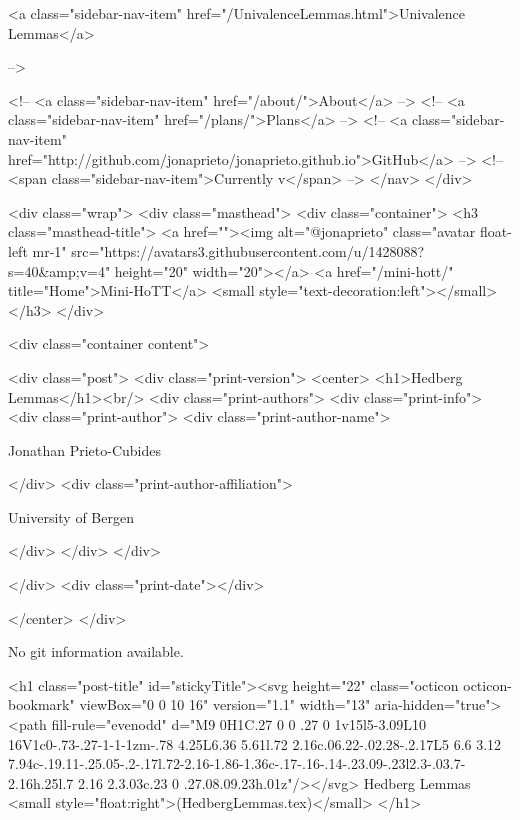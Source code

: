       
    
      
        
          <a class="sidebar-nav-item" href="/UnivalenceLemmas.html">Univalence Lemmas</a>
        
      
     -->

    <!-- <a class="sidebar-nav-item" href="/about/">About</a> -->
    <!-- <a class="sidebar-nav-item" href="/plans/">Plans</a> -->
    <!-- <a class="sidebar-nav-item" href="http://github.com/jonaprieto/jonaprieto.github.io">GitHub</a> -->
    <!-- <span class="sidebar-nav-item">Currently v</span> -->
  </nav>
</div>

    <div class="wrap">
      <div class="masthead">
        <div class="container">
          <h3 class="masthead-title">
            <a href=""><img alt="@jonaprieto" class="avatar float-left mr-1" src="https://avatars3.githubusercontent.com/u/1428088?s=40&amp;v=4" height="20" width="20"></a>
            <a href="/mini-hott/" title="Home">Mini-HoTT</a>
            <small style="text-decoration:left"></small>
          </h3>
        </div>
      
      <div class="container content">
        







<div class="post">
  <div class="print-version">
    <center>
      <h1>Hedberg Lemmas</h1><br/>
        <div class="print-authors">
          <div class="print-info">
            <div class="print-author">
              <div class="print-author-name">
                
                  Jonathan Prieto-Cubides
                
              </div>
              <div class="print-author-affiliation">
                
                  University of Bergen
                
                </div>
            </div>
          </div>
          
          
        </div>
        <div class="print-date"></div>
        
        
    </center>
  </div>

  
  No git information available.
  

  <h1 class="post-title" id="stickyTitle"><svg height="22" class="octicon octicon-bookmark" viewBox="0 0 10 16" version="1.1" width="13" aria-hidden="true"><path fill-rule="evenodd" d="M9 0H1C.27 0 0 .27 0 1v15l5-3.09L10 16V1c0-.73-.27-1-1-1zm-.78 4.25L6.36 5.61l.72 2.16c.06.22-.02.28-.2.17L5 6.6 3.12 7.94c-.19.11-.25.05-.2-.17l.72-2.16-1.86-1.36c-.17-.16-.14-.23.09-.23l2.3-.03.7-2.16h.25l.7 2.16 2.3.03c.23 0 .27.08.09.23h.01z"/></svg> Hedberg Lemmas <small style="float:right">(HedbergLemmas.tex)</small>
  </h1>

